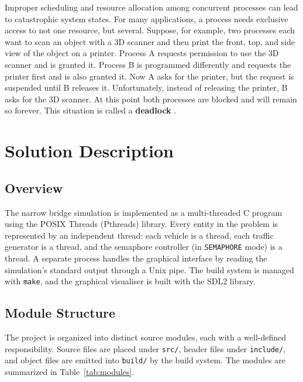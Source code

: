 \documentclass[12pt]{article}
\begin{document}
Improper scheduling and resource allocation among concurrent processes can lead to catastrophic system states. For many applications, a process needs exclusive access to not one resource, but several. Suppose, for example, two processes each want to scan an object with a 3D scanner and then print the front, top, and side view of the object on a printer. Process A requests permission to use the 3D scanner and is granted it. Process B is programmed differently and requests the printer first and is also granted it. Now A asks for the printer, but the request is suspended until B releases it. Unfortunately, instead of releasing the printer, B asks for the 3D scanner. At this point both processes are blocked and will remain so forever. This situation is called a \textbf{deadlock} \cite[Chap.~6, p.~437]{modernOS}.

\section{Solution Description}

\subsection{Overview}

The narrow bridge simulation is implemented as a multi-threaded C program
using the POSIX Threads (Pthreads) library. Every entity in the problem
is represented by an independent thread: each vehicle is a thread, each
traffic generator is a thread, and the semaphore controller (in
\texttt{SEMAPHORE} mode) is a thread. A separate process handles the
graphical interface by reading the simulation's standard output through a
Unix pipe. The build system is managed with \texttt{make}, and the
graphical visualiser is built with the SDL2 library.

\subsection{Module Structure}

The project is organized into distinct source modules, each with a
well-defined responsibility. Source files are placed under \texttt{src/},
header files under \texttt{include/}, and object files are emitted into
\texttt{build/} by the build system. The modules are summarized in
Table~\ref{tab:modules}.
\end{document}
